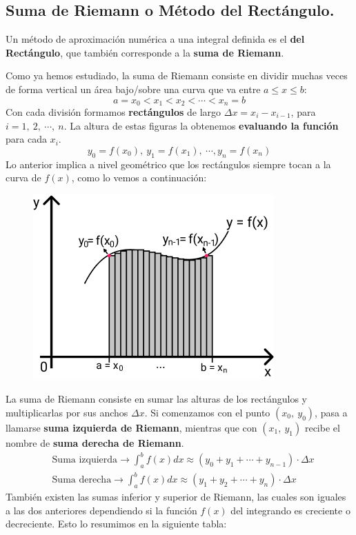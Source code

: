 \documentclass[12pt]{article}
\begin{document}
\subsection{Suma de Riemann o Método del Rectángulo.}

Un método de aproximación numérica a una integral definida es el \textbf{del Rectángulo}, que también corresponde a la \textbf{suma de Riemann}.

Como ya hemos estudiado, la suma de Riemann consiste en dividir muchas veces de forma vertical un área bajo/sobre una curva que va entre $a \leq x \leq b$:
\[
  a = x_{0} < x_{1} < x_{2} < \cdots < x_{n} = b
\]
Con cada división formamos \textbf{rectángulos} de largo $\Delta x = x_{i} - x_{i - 1}$, para $i = 1, \ 2, \ \cdots, \ n$. La altura de estas figuras la obtenemos \textbf{evaluando la función} para cada $x_{i}$.
\[
  y_{0} = f(x_{0}), \ y_{1} = f(x_{1}), \ \cdots, y_{n} = f(x_{n})
\]
Lo anterior implica a nivel geométrico que los rectángulos siempre tocan a la curva de $f(x)$, como lo vemos a continuación:

\begin{figure}[hbt!]
\centering
\includegraphics[scale=0.6]{img/riemann-sum-num-int.jpg}
\end{figure}

La suma de Riemann consiste en sumar las alturas de los rectángulos y multiplicarlas por sus anchos $\Delta x$. Si comenzamos con el punto $(x_{0}, \ y_{0})$, pasa a llamarse \textbf{suma izquierda de Riemann}, mientras que con $(x_{1}, \ y_{1})$ recibe el nombre de \textbf{suma derecha de Riemann}.
\begin{align*}
  &\text{Suma izquierda} \rightarrow \int_{a}^{b} f(x)dx \approx (y_{0} + y_{1} + \cdots + y_{n - 1}) \cdot \Delta x \\
  &\text{Suma derecha} \rightarrow \int_{a}^{b} f(x)dx \approx (y_{1} + y_{2} + \cdots + y_{n}) \cdot \Delta x
\end{align*}
También existen las sumas inferior y superior de Riemann, las cuales son iguales a las dos anteriores dependiendo si la función $f(x)$ del integrando es creciente o decreciente. Esto lo resumimos en la siguiente tabla:
\end{document}
